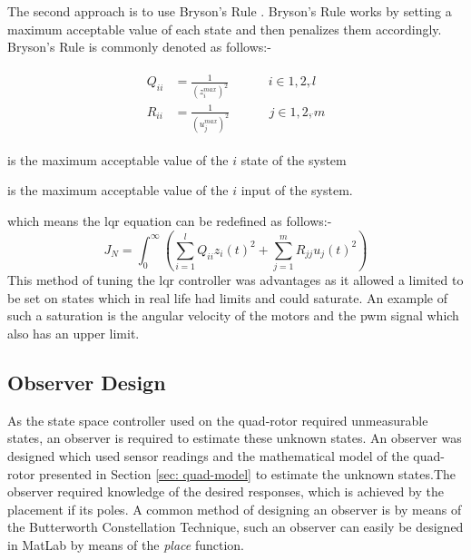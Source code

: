  The second approach is to use Bryson's Rule \cite{franklin2006feedback}. Bryson's Rule works by setting a maximum acceptable value of each state and then penalizes them accordingly. Bryson's Rule is commonly denoted as follows:-      
 
 \begin{align}
 \begin{split}
 Q_{ii} &= \frac{1}{(z_i^{max})^2}~~~~~~~~~~~~~~  i\in 1,2,\ddddot{}l\\
 R_{ii} &= \frac{1}{(u_j^{max})^2}~~~~~~~~~~~~~~        j\in 1,2,\ddddot{}m
 \end{split}
 \end{align}
 
 {	
 	\begin{description}[itemsep=1mm]
 		\item[Where:-]
 		\item[$z_i^{max}$:] is the maximum acceptable value of the $i$ state of the system 
 		\item[$u_i^{max}$:] is the maximum acceptable value of the $i$ input of the system.
 	\end{description}
 }
 
 which means the \gls{lqr} equation can be redefined as follows:-
 \begin{equation}
 J_N = \int_{0}^{\infty}\left(\sum_{i=1}^{l}Q_{ii}z_i(t)^2 + \sum_{j=1}^{m}R_{jj}u_{j}(t)^2\right)
 \end{equation}
 This method of tuning the \gls{lqr} controller was advantages as it allowed a limited to be set on states which in real life had limits and could saturate. An example of such a saturation is the angular velocity of the motors and the \gls{pwm} signal which also has an upper limit.  


\newpage
\subsection{Observer Design}
As the state space controller used on the quad-rotor required unmeasurable states, an observer is required to estimate these unknown states. An observer was designed which used sensor readings and the mathematical model of the quad-rotor presented in Section \ref{sec: quad-model} to estimate the unknown states.The observer required knowledge of the desired responses, which is achieved by the placement if its poles. A common method of designing an observer is by means of the Butterworth Constellation Technique, such an observer can easily be designed in MatLab by means of the \textit{place} function.

